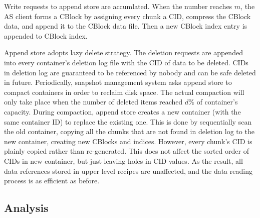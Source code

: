 Write requests to append store are accumlated. When the number reaches $m$, the AS client forms a CBlock by assigning 
every chunk a CID, compress the CBlock data, and append it to the CBlock data file. Then a new CBlock index entry is appended
to CBlock index.

Append store adopts lazy delete strategy. The deletion requests are appended into every container's deletion log file with the CID of data to be deleted.
CIDs in deletion log are guaranteed to be referenced by nobody and can be safe deleted in future. 
Periodically, snapshot management system asks append store to compact containers in order to reclaim disk space. 
The actual compaction will only take place when the number of deleted items reached $d\%$ of container's capacity. 
During compaction, append store creates a new container (with the same container ID) to replace the 
existing one. This is done by sequentially scan the old container, copying all the chunks that are not 
found in deletion log to the new container, creating new CBlocks and indices. 
However, every chunk's CID is plainly copied rather than re-generated. This does not affect the sorted
order of CIDs in new container, but just leaving holes in CID values. As the result, all data references stored 
in upper level recipes are unaffected, and the data reading process is as efficient as before.


\subsection{Analysis}

